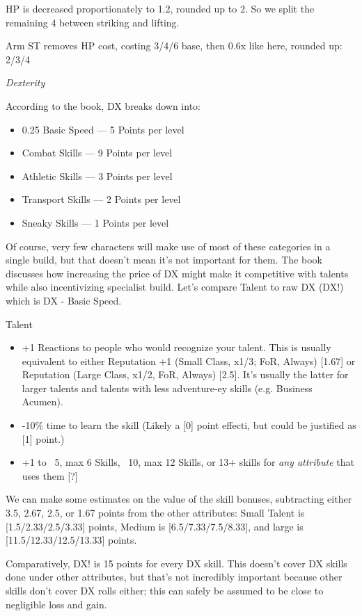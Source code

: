 \begin{multicols*}{2}
	HP is decreased proportionately to 1.2, rounded up to 2. So we split the remaining 4 between striking and lifting.
	
	Arm ST removes HP cost, costing 3/4/6 base, then 0.6x like here, rounded up: 2/3/4	
	
	\textit{Dexterity}
	
	According to the book, DX breaks down into:
	
	\begin{itemize}
		\itemsep 0pt
		\item 0.25 Basic Speed — 5 Points per level
		\item Combat Skills — 9 Points per level
		\item Athletic Skills — 3 Points per level
		\item Transport Skills — 2 Points per level
		\item Sneaky Skills — 1 Points per level
	\end{itemize}
	
	Of course, very few characters will make use of most of these categories in a single build, but that doesn't mean it's not important for them. The book discusses how increasing the price of DX might make it competitive with talents while also incentivizing specialist build. Let's compare Talent to raw DX (DX!) which is DX - Basic Speed.
	
	Talent
	\begin{itemize}
		\itemsep 0pt
		\item +1 Reactions to people who would recognize your talent. This is usually equivalent to either Reputation +1 (Small Class, x1/3; FoR, Always) [1.67] or Reputation (Large Class, x1/2, FoR, Always) [2.5]. It's usually the latter for larger talents and talents with less adventure-ey skills (e.g. Business Acumen).
		\item -10\% time to learn the skill (Likely a [0] point effecti, but could be justified as [1] point.)
		\item +1 to ~5, max 6 Skills, ~10, max 12 Skills, or 13+ skills for \textit{any attribute} that uses them [?]
	\end{itemize}

	We can make some estimates on the value of the skill bonuses, subtracting either 3.5, 2.67, 2.5, or 1.67 points from the other attributes: Small Talent is [1.5/2.33/2.5/3.33] points, Medium is [6.5/7.33/7.5/8.33], and large is [11.5/12.33/12.5/13.33] points. 
	
	Comparatively, DX! is 15 points for every DX skill. This doesn't cover DX skills done under other attributes, but that's not incredibly important because other skills don't cover DX rolls either; this can safely be assumed to be close to negligible loss and gain.


\end{multicols*}

